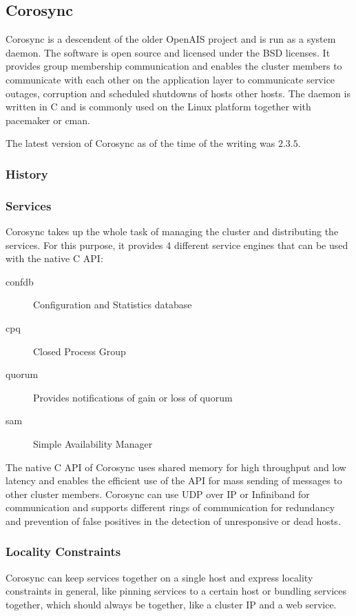 \subsection{Corosync}
Corosync is a descendent of the older OpenAIS project and is run as a system daemon. The software is open source and licensed under the BSD licenses. It provides group membership communication and enables the cluster members to communicate with each other on the application layer to communicate service outages, corruption and scheduled shutdowns of hosts other hosts. The daemon is written in C and is commonly used on the Linux platform together with pacemaker or cman.

The latest version of Corosync as of the time of the writing was $2.3.5$.
\subsubsection{History}
\subsubsection{Services}
Corosync takes up the whole task of managing the cluster and distributing the services. For this purpose, it provides 4 different service engines that can be used with the native C \ac{API}:
\begin{description}
\item [confdb] Configuration and Statistics database
\item [cpq] Closed Process Group
\item [quorum] Provides notifications of gain or loss of quorum
\item [sam] Simple Availability Manager
\end{description}
The native C API of Corosync uses shared memory for high throughput and low 
latency and enables the efficient use of the API for mass sending of messages to 
other cluster members.
\linebreak[3]
Corosync can use \ac{UDP} over IP or Infiniband for communication and supports different 
rings of communication for redundancy and prevention of false positives in the 
detection of unresponsive or dead hosts.
\subsubsection{Locality Constraints}
Corosync can keep services together on a single host and express locality constraints in general,
like pinning services to a certain host or bundling services together, which should
always be together, like a cluster IP and a web service.
